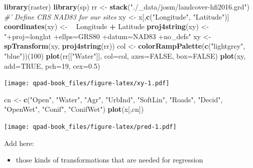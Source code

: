 \documentclass[12pt,]{scrbook}
\newenvironment{Shaded}{\begin{snugshade}}{\end{snugshade}}
\newcommand{\CommentTok}[1]{\textcolor[rgb]{0.56,0.35,0.01}{\textit{#1}}}
\newcommand{\DataTypeTok}[1]{\textcolor[rgb]{0.13,0.29,0.53}{#1}}
\newcommand{\DecValTok}[1]{\textcolor[rgb]{0.00,0.00,0.81}{#1}}
\newcommand{\ErrorTok}[1]{\textcolor[rgb]{0.64,0.00,0.00}{\textbf{#1}}}
\newcommand{\FloatTok}[1]{\textcolor[rgb]{0.00,0.00,0.81}{#1}}
\newcommand{\KeywordTok}[1]{\textcolor[rgb]{0.13,0.29,0.53}{\textbf{#1}}}
\newcommand{\NormalTok}[1]{#1}
\newcommand{\OperatorTok}[1]{\textcolor[rgb]{0.81,0.36,0.00}{\textbf{#1}}}
\newcommand{\OtherTok}[1]{\textcolor[rgb]{0.56,0.35,0.01}{#1}}
\newcommand{\StringTok}[1]{\textcolor[rgb]{0.31,0.60,0.02}{#1}}
\providecommand{\tightlist}{%
  \setlength{\itemsep}{0pt}\setlength{\parskip}{0pt}}
\begin{document}
\begin{Shaded}
\begin{Highlighting}[]
\KeywordTok{library}\NormalTok{(raster)}
\KeywordTok{library}\NormalTok{(sp)}
\NormalTok{rr <-}\StringTok{ }\KeywordTok{stack}\NormalTok{(}\StringTok{"./_data/josm/landcover-hfi2016.grd"}\NormalTok{)}
\CommentTok{#' Define CRS NAD83 for our sites}
\NormalTok{xy <-}\StringTok{ }\NormalTok{x[,}\KeywordTok{c}\NormalTok{(}\StringTok{"Longitude"}\NormalTok{, }\StringTok{"Latitude"}\NormalTok{)]}
\KeywordTok{coordinates}\NormalTok{(xy) <-}\StringTok{ }\ErrorTok{~}\StringTok{ }\NormalTok{Longitude }\OperatorTok{+}\StringTok{ }\NormalTok{Latitude}
\KeywordTok{proj4string}\NormalTok{(xy) <-}\StringTok{ "+proj=longlat +ellps=GRS80 +datum=NAD83 +no_defs"}
\NormalTok{xy <-}\StringTok{ }\KeywordTok{spTransform}\NormalTok{(xy, }\KeywordTok{proj4string}\NormalTok{(rr))}
\NormalTok{col <-}\StringTok{ }\KeywordTok{colorRampPalette}\NormalTok{(}\KeywordTok{c}\NormalTok{(}\StringTok{"lightgrey"}\NormalTok{, }\StringTok{"blue"}\NormalTok{))(}\DecValTok{100}\NormalTok{)}
\KeywordTok{plot}\NormalTok{(rr[[}\StringTok{"Water"}\NormalTok{]], }\DataTypeTok{col=}\NormalTok{col, }\DataTypeTok{axes=}\OtherTok{FALSE}\NormalTok{, }\DataTypeTok{box=}\OtherTok{FALSE}\NormalTok{)}
\KeywordTok{plot}\NormalTok{(xy, }\DataTypeTok{add=}\OtherTok{TRUE}\NormalTok{, }\DataTypeTok{pch=}\DecValTok{19}\NormalTok{, }\DataTypeTok{cex=}\FloatTok{0.5}\NormalTok{)}
\end{Highlighting}
\end{Shaded}

\texttt{[image: qpad-book\_files/figure-latex/xy-1.pdf]}

\begin{Shaded}
\begin{Highlighting}[]
\NormalTok{cn <-}\StringTok{ }\KeywordTok{c}\NormalTok{(}\StringTok{"Open"}\NormalTok{, }\StringTok{"Water"}\NormalTok{, }\StringTok{"Agr"}\NormalTok{, }\StringTok{"UrbInd"}\NormalTok{, }\StringTok{"SoftLin"}\NormalTok{, }\StringTok{"Roads"}\NormalTok{, }
  \StringTok{"Decid"}\NormalTok{, }\StringTok{"OpenWet"}\NormalTok{, }\StringTok{"Conif"}\NormalTok{, }\StringTok{"ConifWet"}\NormalTok{)}
\KeywordTok{plot}\NormalTok{(x[,cn])}
\end{Highlighting}
\end{Shaded}

\texttt{[image: qpad-book\_files/figure-latex/pred-1.pdf]}

Add here:

\begin{itemize}
\tightlist
\item
  those kinds of transformations that are needed for regression
\end{itemize}
\end{document}
